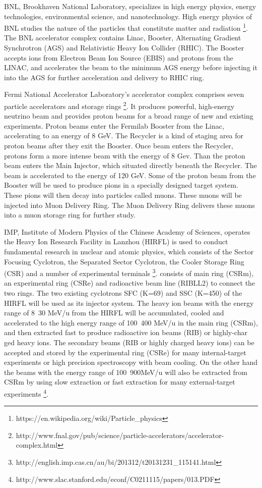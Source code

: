 BNL, Brookhaven National Laboratory, specializes in high energy physics, energy technologies, environmental science, and nanotechnology. High energy physics of BNL studies the nature of the particles that constitute matter and radiation \footnote{https://en.wikipedia.org/wiki/Particle_physics}. The BNL accelerator complex contains Linac, Booster, Alternating Gradient Synchrotron (AGS) and Relativistic Heavy Ion Collider (RHIC). The Booster accepts ions from Electron Beam Ion Source (EBIS) and protons from the LINAC, and accelerates the beam to the minimum AGS energy before injecting it into the AGS for further acceleration and delivery to RHIC ring.

Fermi National Accelerator Laboratory's accelerator complex comprises seven particle accelerators and storage rings \footnote{http://www.fnal.gov/pub/science/particle-accelerators/accelerator-complex.html}. It produces powerful, high-energy neutrino beam and provides proton beams for a broad range of new and existing experiments. Proton beams enter the Fermilab Booster from the Linac, accelerating to an energy of 8 GeV. The Recycler is a kind of staging area for proton beams after they exit the Booster. Once beam enters the Recycler, protons form a more intense beam with the energy of 8 Gev. Than the proton beam enters the Main Injector, which situated directly beneath the Recycler.  The beam is accelerated to the energy of 120 GeV. Some of the proton beam from the Booster will be used to produce pions in a specially designed target system. These pions will then decay into particles called muons. These muons will be injected into Muon Delivery Ring. The Muon Delivery Ring delivers these muons into a muon storage ring for further study.

IMP, Institute of Modern Physics of the Chinese Academy of Sciences, operates the Heavy Ion Research Facility in Lanzhou (HIRFL) is used to conduct fundamental research in nuclear and atomic physics, which consists of the Sector Focusing Cyclotron, the Separated Sector Cyclotron, the Cooler Storage Ring (CSR) and a number of experimental terminals \footnote{http://english.imp.cas.cn/au/bi/201312/t20131231_115141.html}.  consists of main ring (CSRm), an experimental ring (CSRe) and radioactive beam
 line (RIBLL2) to connect the  two  rings.  The  two  existing  cyclotrons  SFC  (K=69)  and  SSC  (K=450)  of  the  HIRFL  will  be  used  as  its  injector  system. The heavy ion beams with the energy range of 8~30  MeV/u  from the HIRFL will be accumulated,  cooled  and  accelerated  to the high energy range  of 100~400  MeV/u  in  the main  ring  (CSRm),  and  then  extracted  fast  to produce   radioactive   ion   beams   (RIB) or highly-char ged   heavy   ions.   The secondary beams (RIB or highly charged heavy ions) can be  accepted and  stored by  the  experimental ring (CSRe) for many internal-target experiments or high precision  spectroscopy with  beam cooling.  On  the  other  hand  the  beams with the energy range of    
100~900MeV/u will also be extracted  from CSRm by using slow extraction or fast extraction for many external-target experiments \footnote{http://www.slac.stanford.edu/econf/C0211115/papers/013.PDF}.  



